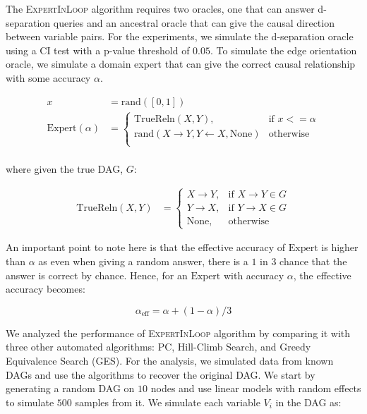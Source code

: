 \documentclass{uai2025} %
\begin{document}
The \textsc{ExpertInLoop} algorithm requires two oracles, one that can answer
d-separation queries and an ancestral oracle that can give the causal direction
between variable pairs. For the experiments, we simulate the d-separation
oracle using a CI test with a p-value threshold of $ 0.05 $. To simulate the
edge orientation oracle, we simulate a domain expert that can give the correct
causal relationship with some accuracy $ \alpha $.

\begin{equation}
	\begin{split}
		x &= \textrm{rand}([0, 1]) \\
		\mathrm{Expert}(\alpha) &= \begin{cases} 
			\mathrm{TrueReln}(X, Y),  & \textrm{if  } x <= \alpha \\
			\textrm{rand}(X \rightarrow Y, Y \leftarrow X, \textrm{None}) & \textrm{otherwise} \\
				\end{cases} \\
	\end{split}
\end{equation}

where given the true DAG, $ G $:

\begin{equation}
	\begin{split}
	\mathrm{TrueReln}(X, Y) &= \begin{cases}
					X \rightarrow Y, & \textrm{if } X \rightarrow Y \in G \\
					Y \rightarrow X, & \textrm{if } Y \rightarrow X \in G \\
					\textrm{None}, & \textrm{otherwise }
				  \end{cases}
	\end{split}
\end{equation}

An important point to note here is that the effective accuracy of $
\mathrm{Expert} $ is higher than $ \alpha $ as even when giving a random
answer, there is a $ 1 $ in $ 3 $ chance that the answer is correct by chance.
Hence, for an $ \mathrm{Expert} $ with accuracy $ \alpha $, the effective
accuracy becomes:

\begin{equation}
	\alpha_{\mathrm{eff}} = \alpha + (1 - \alpha) / 3
\end{equation}


We analyzed the performance of \textsc{ExpertInLoop} algorithm by comparing it
with three other automated algorithms: PC, Hill-Climb Search, and Greedy
Equivalence Search (GES). For the analysis, we simulated data from known DAGs
and use the algorithms to recover the original DAG. We start by generating a
random DAG on $10$ nodes and use linear models with random effects to simulate
$ 500 $ samples from it. We simulate each variable $ V_i $ in the DAG as:
\end{document}
